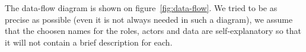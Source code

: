 The data-flow diagram is shown on figure~\ref{fig:data-flow}. We tried
to be as precise as possible (even it is not always needed in such
a diagram), we assume that the choosen names for the roles, actors
and data are self-explanatory so that it will not contain a brief
description for each.


\makeatletter
{}

